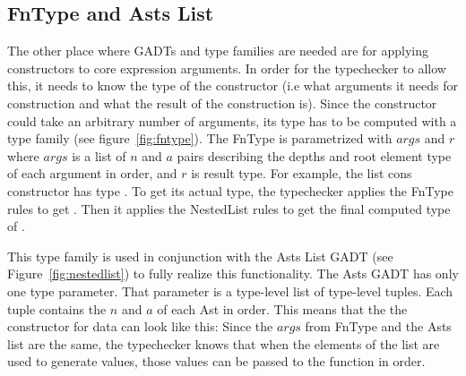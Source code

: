 \subsection{FnType and Asts List}
\par The other place where GADTs and type families are needed are for applying constructors to core expression arguments.
In order for the typechecker to allow this, it needs to know the type of the constructor 
(i.e what arguments it needs for construction and what the result of the construction is).
Since the constructor could take an arbitrary number of arguments, 
its type has to be computed with a type family (see figure~\ref{fig:fntype}).
The FnType is parametrized with $\mathit{args}$ and $r$ where $\mathit{args}$ is a list of $n$ and $a$ pairs describing
the depths and root element type of each argument in order, and $r$ is result type.
For example, the list cons constructor has type . 
To get its actual type, the typechecker applies the FnType rules to get .
Then it applies the NestedList rules to get the final computed type of .

This type family is used in conjunction with the Asts List GADT (see Figure~\ref{fig:nestedlist}) to fully realize this functionality.
The Asts GADT has only one type parameter. That parameter is a type-level list of type-level tuples. Each tuple contains the $n$
and $a$ of each Ast in order.
This means that the the constructor for data can look like this:
Since the $\mathit{args}$ from FnType and the Asts list are the same, the typechecker knows that when the elements of the list
are used to generate values, those values can be passed to the function in order.



